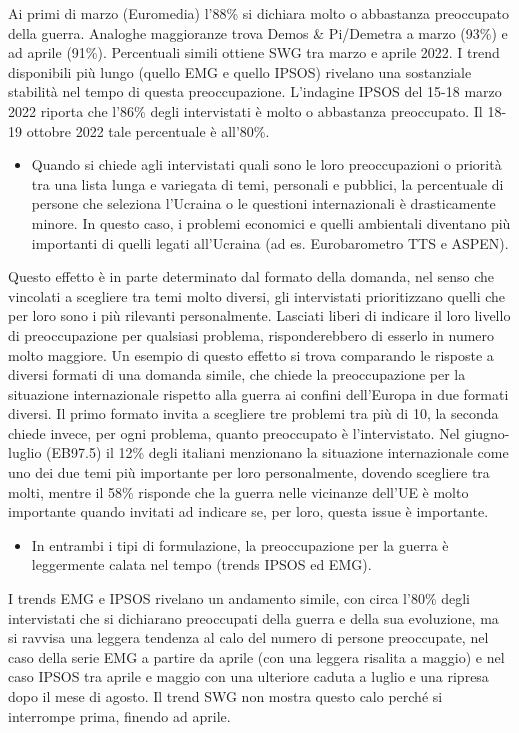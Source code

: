 \documentclass[
]{book}
\providecommand{\tightlist}{%
  \setlength{\itemsep}{0pt}\setlength{\parskip}{0pt}}
\begin{document}
Ai primi di marzo (Euromedia) l'88\% si dichiara molto o abbastanza preoccupato della guerra. Analoghe maggioranze trova Demos \& Pi/Demetra a marzo (93\%) e ad aprile (91\%). Percentuali simili ottiene SWG tra marzo e aprile 2022. I trend disponibili più lungo (quello EMG e quello IPSOS) rivelano una sostanziale stabilità nel tempo di questa preoccupazione. L'indagine IPSOS del 15-18 marzo 2022 riporta che l'86\% degli intervistati è molto o abbastanza preoccupato. Il 18-19 ottobre 2022 tale percentuale è all'80\%.

\begin{itemize}
\tightlist
\item
  Quando si chiede agli intervistati quali sono le loro preoccupazioni o priorità tra una lista lunga e variegata di temi, personali e pubblici, la percentuale di persone che seleziona l'Ucraina o le questioni internazionali è drasticamente minore. In questo caso, i problemi economici e quelli ambientali diventano più importanti di quelli legati all'Ucraina (ad es. Eurobarometro TTS e ASPEN).
\end{itemize}

Questo effetto è in parte determinato dal formato della domanda, nel senso che vincolati a scegliere tra temi molto diversi, gli intervistati prioritizzano quelli che per loro sono i più rilevanti personalmente. Lasciati liberi di indicare il loro livello di preoccupazione per qualsiasi problema, risponderebbero di esserlo in numero molto maggiore. Un esempio di questo effetto si trova comparando le risposte a diversi formati di una domanda simile, che chiede la preoccupazione per la situazione internazionale rispetto alla guerra ai confini dell'Europa in due formati diversi. Il primo formato invita a scegliere tre problemi tra più di 10, la seconda chiede invece, per ogni problema, quanto preoccupato è l'intervistato. Nel giugno-luglio (EB97.5) il 12\% degli italiani menzionano la situazione internazionale come uno dei due temi più importante per loro personalmente, dovendo scegliere tra molti, mentre il 58\% risponde che la guerra nelle vicinanze dell'UE è molto importante quando invitati ad indicare se, per loro, questa issue è importante.

\begin{itemize}
\tightlist
\item
  In entrambi i tipi di formulazione, la preoccupazione per la guerra è leggermente calata nel tempo (trends IPSOS ed EMG).
\end{itemize}

I trends EMG e IPSOS rivelano un andamento simile, con circa l'80\% degli intervistati che si dichiarano preoccupati della guerra e della sua evoluzione, ma si ravvisa una leggera tendenza al calo del numero di persone preoccupate, nel caso della serie EMG a partire da aprile (con una leggera risalita a maggio) e nel caso IPSOS tra aprile e maggio con una ulteriore caduta a luglio e una ripresa dopo il mese di agosto. Il trend SWG non mostra questo calo perché si interrompe prima, finendo ad aprile.
\end{document}
